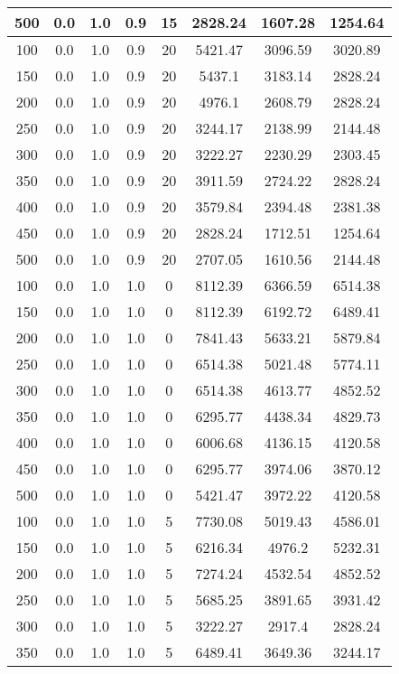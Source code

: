 \documentclass[a4paper, 12pt]{extreport}
\begin{document}
\begin{itemize}
\begin{longtable}{|c|c|c|c|c|c|c|c|}
			500 & 0.0 & 1.0 & 0.9 & 15 & 2828.24 & 1607.28 & 1254.64 \\\hline
			100 & 0.0 & 1.0 & 0.9 & 20 & 5421.47 & 3096.59 & 3020.89 \\\hline
			150 & 0.0 & 1.0 & 0.9 & 20 & 5437.1 & 3183.14 & 2828.24 \\\hline
			200 & 0.0 & 1.0 & 0.9 & 20 & 4976.1 & 2608.79 & 2828.24 \\\hline
			250 & 0.0 & 1.0 & 0.9 & 20 & 3244.17 & 2138.99 & 2144.48 \\\hline
			300 & 0.0 & 1.0 & 0.9 & 20 & 3222.27 & 2230.29 & 2303.45 \\\hline
			350 & 0.0 & 1.0 & 0.9 & 20 & 3911.59 & 2724.22 & 2828.24 \\\hline
			400 & 0.0 & 1.0 & 0.9 & 20 & 3579.84 & 2394.48 & 2381.38 \\\hline
			450 & 0.0 & 1.0 & 0.9 & 20 & 2828.24 & 1712.51 & 1254.64 \\\hline
			500 & 0.0 & 1.0 & 0.9 & 20 & 2707.05 & 1610.56 & 2144.48 \\\hline
			100 & 0.0 & 1.0 & 1.0 & 0 & 8112.39 & 6366.59 & 6514.38 \\\hline
			150 & 0.0 & 1.0 & 1.0 & 0 & 8112.39 & 6192.72 & 6489.41 \\\hline
			200 & 0.0 & 1.0 & 1.0 & 0 & 7841.43 & 5633.21 & 5879.84 \\\hline
			250 & 0.0 & 1.0 & 1.0 & 0 & 6514.38 & 5021.48 & 5774.11 \\\hline
			300 & 0.0 & 1.0 & 1.0 & 0 & 6514.38 & 4613.77 & 4852.52 \\\hline
			350 & 0.0 & 1.0 & 1.0 & 0 & 6295.77 & 4438.34 & 4829.73 \\\hline
			400 & 0.0 & 1.0 & 1.0 & 0 & 6006.68 & 4136.15 & 4120.58 \\\hline
			450 & 0.0 & 1.0 & 1.0 & 0 & 6295.77 & 3974.06 & 3870.12 \\\hline
			500 & 0.0 & 1.0 & 1.0 & 0 & 5421.47 & 3972.22 & 4120.58 \\\hline
			100 & 0.0 & 1.0 & 1.0 & 5 & 7730.08 & 5019.43 & 4586.01 \\\hline
			150 & 0.0 & 1.0 & 1.0 & 5 & 6216.34 & 4976.2 & 5232.31 \\\hline
			200 & 0.0 & 1.0 & 1.0 & 5 & 7274.24 & 4532.54 & 4852.52 \\\hline
			250 & 0.0 & 1.0 & 1.0 & 5 & 5685.25 & 3891.65 & 3931.42 \\\hline
			300 & 0.0 & 1.0 & 1.0 & 5 & 3222.27 & 2917.4 & 2828.24 \\\hline
			350 & 0.0 & 1.0 & 1.0 & 5 & 6489.41 & 3649.36 & 3244.17 \\\hline

\end{longtable}
\end{itemize}
\end{document}
